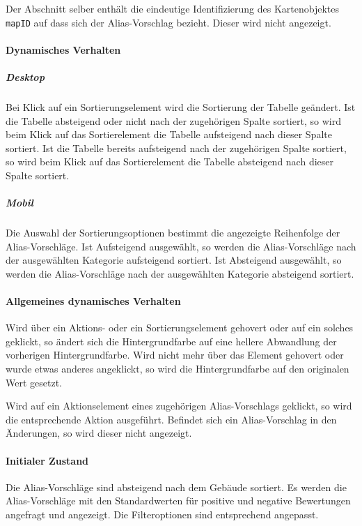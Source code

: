Der Abschnitt selber enthält die eindeutige Identifizierung des Kartenobjektes \verb#mapID# auf dass sich der Alias-Vorschlag bezieht. Dieser wird nicht angezeigt.

\paragraph*{Dynamisches Verhalten}
\subparagraph*{Desktop}
Bei Klick auf ein Sortierungselement wird die Sortierung der Tabelle geändert.
Ist die Tabelle absteigend oder nicht nach der zugehörigen Spalte sortiert, so wird beim Klick auf das Sortierelement die Tabelle aufsteigend nach dieser Spalte sortiert.
Ist die Tabelle bereits aufsteigend nach der zugehörigen Spalte sortiert, so wird beim Klick auf das Sortierelement die Tabelle absteigend nach dieser Spalte sortiert.

\subparagraph*{Mobil}
Die Auswahl der Sortierungsoptionen bestimmt die angezeigte Reihenfolge der Alias-Vorschläge.
Ist \dq Aufsteigend \dq{} ausgewählt, so werden die Alias-Vorschläge nach der ausgewählten Kategorie aufsteigend sortiert.
Ist \dq Absteigend \dq{} ausgewählt, so werden die Alias-Vorschläge nach der ausgewählten Kategorie absteigend sortiert.

\paragraph*{Allgemeines dynamisches Verhalten}
Wird über ein Aktions- oder ein Sortierungselement gehovert oder auf ein solches geklickt, so ändert sich die Hintergrundfarbe auf eine hellere Abwandlung der vorherigen Hintergrundfarbe.
Wird nicht mehr über das Element gehovert oder wurde etwas anderes angeklickt, so wird die Hintergrundfarbe auf den originalen Wert gesetzt.

Wird auf ein Aktionselement eines zugehörigen Alias-Vorschlags geklickt, so wird die entsprechende Aktion ausgeführt.
Befindet sich ein Alias-Vorschlag in den Änderungen, so wird dieser nicht angezeigt.

\paragraph*{Initialer Zustand}
Die Alias-Vorschläge sind absteigend nach dem Gebäude sortiert.
Es werden die Alias-Vorschläge mit den Standardwerten für positive und negative Bewertungen angefragt und angezeigt.
Die Filteroptionen sind entsprechend angepasst.

